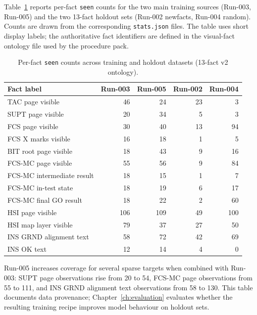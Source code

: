 Table~\ref{tab:fact-distributions} reports per-fact \texttt{seen} counts for
the two main training sources (Run-003, Run-005) and the two 13-fact holdout
sets (Run-002 newfacts, Run-004 random). Counts are drawn from the
corresponding \texttt{stats.json} files. The table uses short display labels;
the authoritative fact identifiers are defined in the visual-fact ontology
file used by the procedure pack.

\begin{table}[htbp]
\centering
\caption{Per-fact \texttt{seen} counts across training and holdout datasets (13-fact v2 ontology).}
\label{tab:fact-distributions}
\small
\begin{tabularx}{\textwidth}{@{}>{\raggedright\arraybackslash}Xrrrr@{}}
\toprule
\textbf{Fact label} & \textbf{Run-003} & \textbf{Run-005} & \textbf{Run-002} & \textbf{Run-004} \\
\midrule
TAC page visible            & 46  & 24  & 23 & 3  \\
SUPT page visible           & 20  & 34  & 5  & 3  \\
FCS page visible            & 30  & 40  & 13 & 94 \\
FCS X marks visible         & 16  & 18  & 1  & 5  \\
BIT root page visible       & 18  & 43  & 9  & 16 \\
FCS-MC page visible         & 55  & 56  & 9  & 84 \\
FCS-MC intermediate result  & 18  & 15  & 1  & 7  \\
FCS-MC in-test state        & 18  & 19  & 6  & 17 \\
FCS-MC final GO result      & 18  & 22  & 2  & 60 \\
HSI page visible            & 106 & 109 & 49 & 100 \\
HSI map layer visible       & 79  & 37  & 27 & 50 \\
INS GRND alignment text     & 58  & 72  & 42 & 69 \\
INS OK text                 & 12  & 14  & 4  & 0  \\
\bottomrule
\end{tabularx}
\end{table}


Run-005 increases coverage for several sparse targets when combined with
Run-003: SUPT page observations rise from 20 to 54, FCS-MC page observations
from 55 to 111, and INS GRND alignment text observations from 58 to 130. This
table documents data provenance; Chapter~\ref{ch:evaluation} evaluates whether
the resulting training recipe improves model behaviour on holdout sets.

